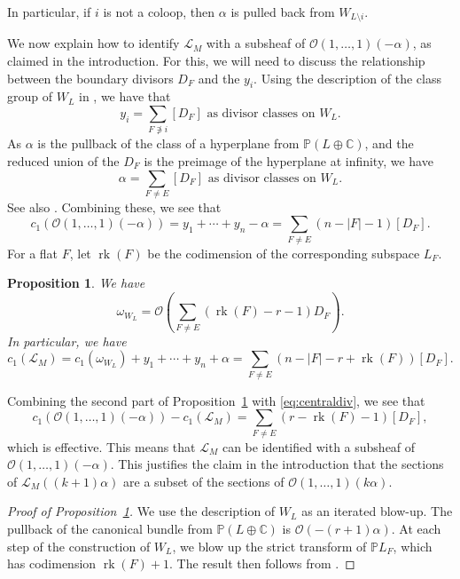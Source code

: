 \documentclass{amsart}
\newtheorem{proposition}[theorem]{Proposition}
\theoremstyle{definition}
\begin{document}
In particular, if $i$ is not a coloop, then $\alpha$ is pulled back from $W_{L \setminus i}$. 




We now explain how to identify $\mathcal{L}_M$ with a subsheaf of $\mathcal{O}(1, \dotsc, 1)(-\alpha)$, as claimed in the introduction. For this, we will need to discuss the relationship between the boundary divisors $D_F$ and the $y_i$. Using the description of the class group of $W_L$ in \cite[Section 1.2]{BHMPW20a}, we have that
$$y_i = \sum_{F \not \ni i} [D_F] \text{ as divisor classes on }W_L.$$
As $\alpha$ is the pullback of the class of a hyperplane from $\mathbb{P}(L \oplus \mathbb{C})$, and the reduced union of the $D_F$ is the preimage of the hyperplane at infinity, we have
$$\alpha = \sum_{F\not= E} [D_F] \text{ as divisor classes on }W_L.$$
See also \cite[Section 1.4]{BHMPW20a}. Combining these, we see that 
\begin{equation}\label{eq:centraldiv}
c_1(\mathcal{O}(1, \dotsc, 1)(-\alpha)) = y_1 + \dotsb + y_n - \alpha = \sum_{F \not= E} (n - |F| - 1) [D_F].
\end{equation}
For a flat $F$, let $\operatorname{rk}(F)$ be the codimension of the corresponding subspace $L_F$. 
\begin{proposition}\label{prop:canonical}
We have 
$$\omega_{W_L} = \mathcal{O}(\sum_{F\not= E} (\operatorname{rk}(F) 
    - r - 1) D_F).$$
In particular, we have
$$c_1(\mathcal{L}_M) = c_1(\omega_{W_L}) + y_1 + \dotsb + y_n + \alpha = \sum_{F \not= E} (n - |F| - r + \operatorname{rk}(F))[D_F].$$
\end{proposition}
Combining the second part of Proposition~\ref{prop:canonical} with \eqref{eq:centraldiv}, we see that
$$c_1(\mathcal{O}(1, \dotsc,1)(-\alpha)) - c_1(\mathcal{L}_M) = \sum_{F \not= E} (r - \operatorname{rk}(F) - 1)[D_F],$$
which is effective. This means that $\mathcal{L}_M$ can be identified with a subsheaf of $\mathcal{O}(1, \dotsc, 1)(-\alpha)$. This justifies the claim in the introduction that the sections of $\mathcal{L}_M((k+1)\alpha)$ are a subset of the sections of $\mathcal{O}(1, \dotsc, 1)(k\alpha)$. 

\begin{proof}[Proof of Proposition~\ref{prop:canonical}]
We use the description of $W_L$ as an iterated blow-up. The pullback of the canonical bundle from $\mathbb{P}(L \oplus \mathbb{C})$ is $\mathcal{O}(-(r + 1)\alpha)$. At each step of the construction of $W_L$, we blow up the strict transform of $\mathbb{P}L_F$, which has codimension $\operatorname{rk}(F) + 1$. The result then follows from \cite[Exercise 22.4.S]{VakilNotes}. 
\end{proof}
\end{document}
